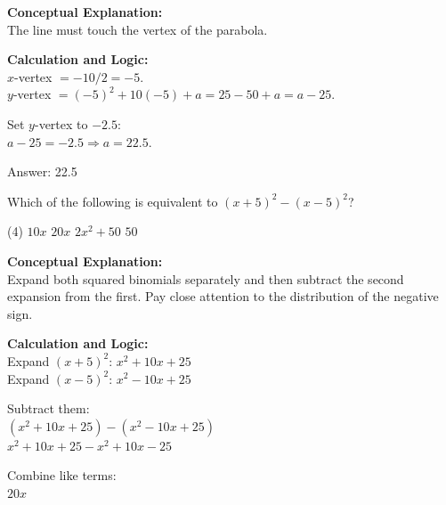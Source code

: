 \documentclass[11pt,paper=a4,answers]{exam}
\begin{document}
\begin{questions}
\begin{solution}
\textbf{Conceptual Explanation:} \\
The line must touch the vertex of the parabola.

\vspace{20pt}

\textbf{Calculation and Logic:} \\
$x$-vertex $= -10/2 = -5$. \\
$y$-vertex $= (-5)^2 + 10(-5) + a = 25 - 50 + a = a - 25$.

\vspace{10pt}

Set $y$-vertex to $-2.5$: \\
$a - 25 = -2.5 \Rightarrow a = 22.5$.

\vspace{25pt}

Answer: \colorbox{yellow!100}{22.5}
\end{solution}


\question
Which of the following is equivalent to $(x + 5)^2 - (x - 5)^2$?
\begin{tasks}(4)
    \task $10x$
    \task $20x$
    \task $2x^2 + 50$
    \task $50$
\end{tasks}

\begin{solution}
\textbf{Conceptual Explanation:} \\
Expand both squared binomials separately and then subtract the second expansion from the first. Pay close attention to the distribution of the negative sign.

\vspace{20pt}

\textbf{Calculation and Logic:} \\
Expand $(x + 5)^2$: $x^2 + 10x + 25$ \\
Expand $(x - 5)^2$: $x^2 - 10x + 25$

\vspace{10pt}

Subtract them: \\
$(x^2 + 10x + 25) - (x^2 - 10x + 25)$ \\
$x^2 + 10x + 25 - x^2 + 10x - 25$

\vspace{10pt}

Combine like terms: \\
$20x$


\end{solution}
\end{questions}
\end{document}
